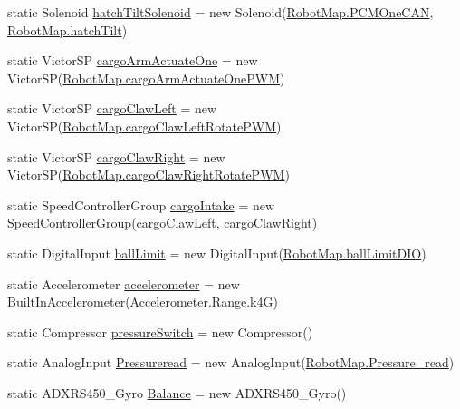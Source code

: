 \begin{DoxyCompactItemize}
\item 
static Solenoid \hyperlink{classfrc_1_1robot_1_1_o_i_aa8cdb6b236dfb9fead12621b4f42c274}{hatch\+Tilt\+Solenoid} = new Solenoid(\hyperlink{classfrc_1_1robot_1_1_robot_map_a79a848df56d706c787d9a4f9a0434e7f}{Robot\+Map.\+P\+C\+M\+One\+C\+AN}, \hyperlink{classfrc_1_1robot_1_1_robot_map_a0c656cb43ea0fd37d6b94991e8473bf9}{Robot\+Map.\+hatch\+Tilt})
\item 
static Victor\+SP \hyperlink{classfrc_1_1robot_1_1_o_i_aeee9fe6efef4ea8f2558ccd2de43e71a}{cargo\+Arm\+Actuate\+One} = new Victor\+SP(\hyperlink{classfrc_1_1robot_1_1_robot_map_aaff9d0adef8e1f97db2ac47f985f044a}{Robot\+Map.\+cargo\+Arm\+Actuate\+One\+P\+WM})
\item 
static Victor\+SP \hyperlink{classfrc_1_1robot_1_1_o_i_a7ec725773fd1bb5dc4263980a232e75f}{cargo\+Claw\+Left} = new Victor\+SP(\hyperlink{classfrc_1_1robot_1_1_robot_map_aa5824f279bf68bbd68ae1ea3087c4b67}{Robot\+Map.\+cargo\+Claw\+Left\+Rotate\+P\+WM})
\item 
static Victor\+SP \hyperlink{classfrc_1_1robot_1_1_o_i_a32fd81c9a712924aa42a9eb74f278df1}{cargo\+Claw\+Right} = new Victor\+SP(\hyperlink{classfrc_1_1robot_1_1_robot_map_a108c3b97c541e7ed5a152cea66981231}{Robot\+Map.\+cargo\+Claw\+Right\+Rotate\+P\+WM})
\item 
static Speed\+Controller\+Group \hyperlink{classfrc_1_1robot_1_1_o_i_a40d2adcc988805032885ba668fc6f86f}{cargo\+Intake} = new Speed\+Controller\+Group(\hyperlink{classfrc_1_1robot_1_1_o_i_a7ec725773fd1bb5dc4263980a232e75f}{cargo\+Claw\+Left}, \hyperlink{classfrc_1_1robot_1_1_o_i_a32fd81c9a712924aa42a9eb74f278df1}{cargo\+Claw\+Right})
\item 
static Digital\+Input \hyperlink{classfrc_1_1robot_1_1_o_i_aebf7c01734a48f269b40f7b1f1125f10}{ball\+Limit} = new Digital\+Input(\hyperlink{classfrc_1_1robot_1_1_robot_map_a83f3eec03443af1dbe44492871796c92}{Robot\+Map.\+ball\+Limit\+D\+IO})
\item 
static Accelerometer \hyperlink{classfrc_1_1robot_1_1_o_i_a57e609e018f3013d5beb8bffa5771df0}{accelerometer} = new Built\+In\+Accelerometer(Accelerometer.\+Range.\+k4G)
\item 
static Compressor \hyperlink{classfrc_1_1robot_1_1_o_i_a68157a4a30cc0fae8bc36ae0ac999c82}{pressure\+Switch} = new Compressor()
\item 
static Analog\+Input \hyperlink{classfrc_1_1robot_1_1_o_i_a763d5acad9b29d4b29b0fff838059571}{Pressureread} = new Analog\+Input(\hyperlink{classfrc_1_1robot_1_1_robot_map_a10cc39db919c29133e2bc774281804b0}{Robot\+Map.\+Pressure\+\_\+read})
\item 
static A\+D\+X\+R\+S450\+\_\+\+Gyro \hyperlink{classfrc_1_1robot_1_1_o_i_a951d7ff102fca8319e5a9401a0f2214b}{Balance} = new A\+D\+X\+R\+S450\+\_\+\+Gyro()
\end{DoxyCompactItemize}


